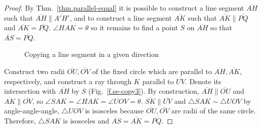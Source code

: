 \begin{proof}
By Thm.~\ref{thm.parallel-equal} it is possible to construct a line segment $\overline{AH}$ such that $\overline{AH}\parallel\overline{A'H'}$, and to construct a line segment $\overline{AK}$ such that $\overline{AK}\parallel\overline{PQ}$ and $\overline{AK}=\overline{PQ}$.
$\angle HAK=\theta$ so it remains to find a point $S$ on $\overline{AH}$ so that $\overline{AS}=\overline{PQ}$.

\begin{figure}[t]
\begin{center}
\end{center}
\caption{Copying a line segment in a given direction}\label{f.se-copy1}
\end{figure}

Construct two radii $\overline{OU}, \overline{OV}$ of the fixed circle which are parallel to $\overline{AH}, \overline{AK}$, respectively, and construct a ray through $K$ parallel to $\overline{UV}$. Denote its intersection with $\overline{AH}$ by $S$ (Fig.~\ref{f.se-copy3}). By construction, $\overline{AH}\parallel\overline{OU}$ and $\overline{AK}\parallel\overline{OV}$, so $\angle SAK=\angle HAK=\angle UOV=\theta$. $\overline{SK}\parallel\overline{UV}$ and $\triangle SAK\sim\triangle UOV$ by angle-angle-angle, $\triangle UOV$ is isosceles because $\overline{OU}, \overline{OV}$ are radii of the same circle. Therefore, $\triangle SAK$ is isosceles and $\overline{AS}=\overline{AK}=\overline{PQ}$.
\end{proof}

